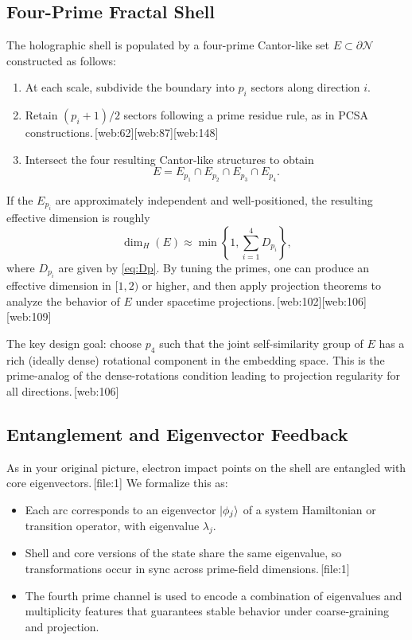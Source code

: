 \documentclass[11pt]{article}
\begin{document}
\subsection{Four-Prime Fractal Shell}

The holographic shell is populated by a four-prime Cantor-like set
$E\subset\partial\mathcal{N}$ constructed as follows:

\begin{enumerate}[leftmargin=*]
  \item At each scale, subdivide the boundary into $p_i$ sectors along
  direction $i$.
  \item Retain $(p_i+1)/2$ sectors following a prime residue rule, as in
  PCSA constructions.\,[web:62][web:87][web:148]
  \item Intersect the four resulting Cantor-like structures to obtain
  \[
    E = E_{p_1} \cap E_{p_2} \cap E_{p_3} \cap E_{p_4}.
  \]
\end{enumerate}

If the $E_{p_i}$ are approximately independent and well-positioned,
the resulting effective dimension is roughly
\[
  \dim_H(E) \approx \min\left\{
  1, \sum_{i=1}^4 D_{p_i}
  \right\},
\]
where $D_{p_i}$ are given by \eqref{eq:Dp}.
By tuning the primes, one can produce an effective dimension in
$[1,2)$ or higher, and then apply projection theorems to analyze the
behavior of $E$ under spacetime projections.\,[web:102][web:106][web:109]

The key design goal: choose $p_4$ such that the joint self-similarity
group of $E$ has a rich (ideally dense) rotational component in the
embedding space.
This is the prime-analog of the dense-rotations condition leading to
projection regularity for all directions.\,[web:106]

\subsection{Entanglement and Eigenvector Feedback}

As in your original picture, electron impact points on the shell are
entangled with core eigenvectors.\,[file:1]
We formalize this as:

\begin{itemize}[leftmargin=*]
  \item Each arc corresponds to an eigenvector $\ket{\phi_j}$ of a
  system Hamiltonian or transition operator, with eigenvalue $\lambda_j$.
  \item Shell and core versions of the state share the same eigenvalue,
  so transformations occur in sync across prime-field dimensions.\,[file:1]
  \item The fourth prime channel is used to encode a combination of
  eigenvalues and multiplicity features that guarantees stable behavior
  under coarse-graining and projection.
\end{itemize}
\end{document}
